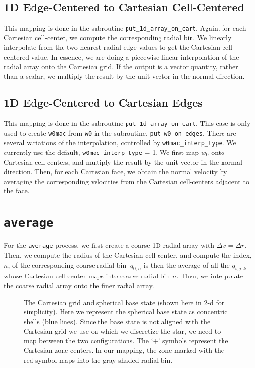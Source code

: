 \subsection{1D Edge-Centered to Cartesian Cell-Centered}
This mapping is done in the subroutine {\tt put\_1d\_array\_on\_cart}.
Again, for each Cartesian cell-center, we compute the corresponding radial
bin.  We linearly interpolate from the two nearest radial edge values 
to get the Cartesian cell-centered value.  In essence,
we are doing a piecewise linear interpolation of the radial array onto the 
Cartesian grid.  If the output is a vector quantity, rather than a scalar, we
multiply the result by the unit vector in the normal direction.
\subsection{1D Edge-Centered to Cartesian Edges}
This mapping is done in the subroutine {\tt put\_1d\_array\_on\_cart}.
This case is only used to create {\tt w0mac} from {\tt w0} in the 
subroutine, {\tt put\_w0\_on\_edges}.  There are several variations 
of the interpolation, controlled by {\tt w0mac\_interp\_type}.  We 
currently use the default, {\tt w0mac\_interp\_type} = 1.  We first 
map $w_0$ onto Cartesian cell-centers, and multiply the result by 
the unit vector in the normal direction.  Then, for each Cartesian 
face, we obtain the normal velocity by averaging the corresponding 
velocities from the Cartesian cell-centers adjacent to the face.
\section{\tt average}
For the {\tt average} process, we first create a coarse 1D radial array 
with $\Delta x = \Delta r$.  Then, we compute the radius of the Cartesian cell 
center, and compute the index, $n$, of the corresponding coarse radial 
bin.  $q_{0,n}$ is then the average of all the $q_{i,j,k}$ whose 
Cartesian cell center maps into coarse radial bin $n$.  Then, we 
interpolate the coarse radial array onto the finer radial array.

\clearpage

\begin{figure}[tpb]
\begin{center}
\caption{\label{fig:mapping} The Cartesian grid and spherical base
state (shown here in 2-d for simplicity).  Here we represent the
spherical base state as concentric shells (blue lines).  Since the
base state is not aligned with the Cartesian grid we use on which
we discretize the star, we need to map between the two configurations.
The `$+$' symbols represent the Cartesian zone centers.  In our
mapping, the zone marked with the red symbol maps into the gray-shaded
radial bin. }
\label{fig:mapping}
\end{center}
\end{figure}
